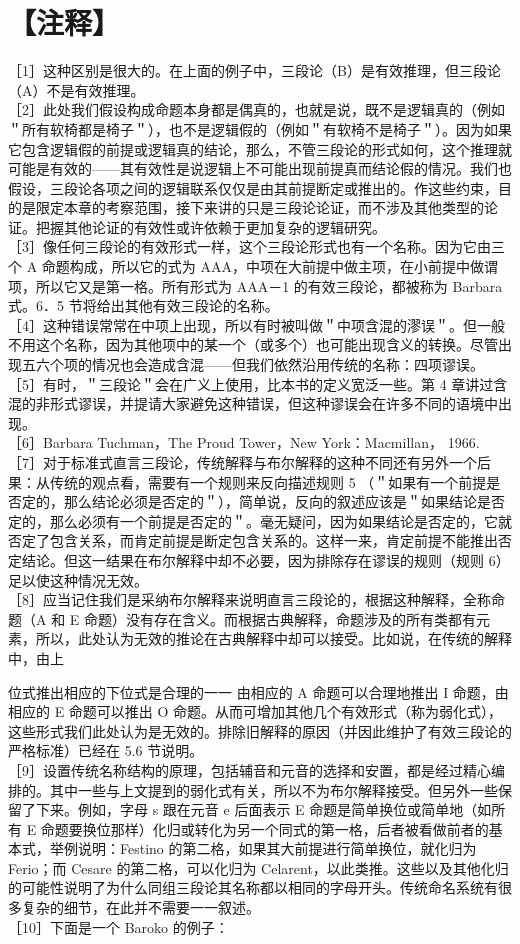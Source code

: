 \section*{【注释】}
［1］这种区别是很大的。在上面的例子中，三段论（B）是有效推理，但三段论 （A）不是有效推理。\\
［2］此处我们假设构成命题本身都是偶真的，也就是说，既不是逻辑真的（例如 ＂所有软椅都是椅子＂），也不是逻辑假的（例如＂有软椅不是椅子＂）。因为如果它包含逻辑假的前提或逻辑真的结论，那么，不管三段论的形式如何，这个推理就可能是有效的——其有效性是说逻辑上不可能出现前提真而结论假的情况。我们也假设，三段论各项之间的逻辑联系仅仅是由其前提断定或推出的。作这些约束，目的是限定本章的考察范围，接下来讲的只是三段论论证，而不涉及其他类型的论证。把握其他论证的有效性或许依赖于更加复杂的逻辑研究。\\
［3］像任何三段论的有效形式一样，这个三段论形式也有一个名称。因为它由三个 A 命题构成，所以它的式为 AAA，中项在大前提中做主项，在小前提中做谓项，所以它又是第一格。所有形式为 AAA－1 的有效三段论，都被称为 Barbara 式。6．5 节将给出其他有效三段论的名称。\\
［4］这种错误常常在中项上出现，所以有时被叫做＂中项含混的漻误＂。但一般不用这个名称，因为其他项中的某一个（或多个）也可能出现含义的转换。尽管出现五六个项的情况也会造成含混——但我们依然沿用传统的名称：四项谬误。\\
［5］有时，＂三段论＂会在广义上使用，比本书的定义宽泛一些。第 4 章讲过含混的非形式谬误，并提请大家避免这种错误，但这种谬误会在许多不同的语境中出现。\\
［6］Barbara Tuchman，The Proud Tower，New York：Macmillan， 1966.\\
［7］对于标准式直言三段论，传统解释与布尔解释的这种不同还有另外一个后果：从传统的观点看，需要有一个规则来反向描述规则 5 （＂如果有一个前提是否定的，那么结论必须是否定的＂），简单说，反向的叙述应该是＂如果结论是否定的，那么必须有一个前提是否定的＂。毫无疑问，因为如果结论是否定的，它就否定了包含关系，而肯定前提是断定包含关系的。这样一来，肯定前提不能推出否定结论。但这一结果在布尔解释中却不必要，因为排除存在谬误的规则（规则 6）足以使这种情况无效。\\
［8］应当记住我们是采纳布尔解释来说明直言三段论的，根据这种解释，全称命题（A 和 E 命题）没有存在含义。而根据古典解释，命题涉及的所有类都有元素，所以，此处认为无效的推论在古典解释中却可以接受。比如说，在传统的解释中，由上

位式推出相应的下位式是合理的一一 由相应的 A 命题可以合理地推出 I 命题，由相应的 E 命题可以推出 O 命题。从而可增加其他几个有效形式（称为弱化式），这些形式我们此处认为是无效的。排除旧解释的原因（并因此维护了有效三段论的严格标准）已经在 5.6 节说明。\\
［9］设置传统名称结构的原理，包括辅音和元音的选择和安置，都是经过精心编排的。其中一些与上文提到的弱化式有关，所以不为布尔解释接受。但另外一些保留了下来。例如，字母 s 跟在元音 e 后面表示 E 命题是简单换位或简单地（如所有 E 命题要换位那样）化归或转化为另一个同式的第一格，后者被看做前者的基本式，举例说明：Festino 的第二格，如果其大前提进行简单换位，就化归为 Ferio；而 Cesare 的第二格，可以化归为 Celarent，以此类推。这些以及其他化归的可能性说明了为什么同组三段论其名称都以相同的字母开头。传统命名系统有很多复杂的细节，在此并不需要一一叙述。\\
［10］下面是一个 Baroko 的例子：

